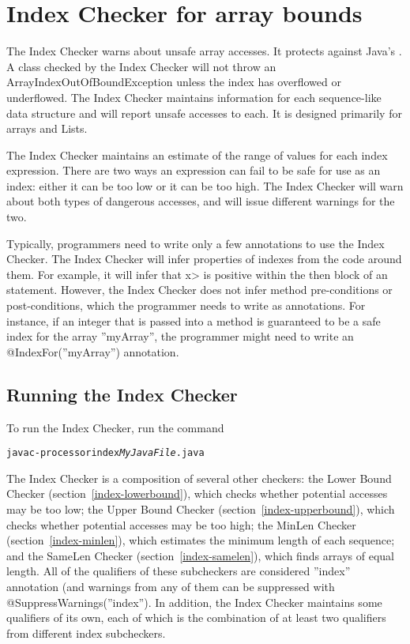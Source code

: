 \chapter{Index Checker for array bounds\label{index-checker}}

The Index Checker warns about unsafe array accesses.  It protects
against Java's
. A
class checked by the
Index Checker  will not throw an ArrayIndexOutOfBoundException unless the
index has overflowed or underflowed. The Index Checker maintains information
for each sequence-like data structure and will report unsafe accesses to each.
It is designed primarily for arrays and Lists.

The Index Checker maintains an estimate of the range of values for each
index expression.  There are two ways an expression can fail to be safe for use as an
index: either it can be too low or it can be too high. The Index
Checker will warn about both types of dangerous accesses, and will
issue different warnings for the two.

Typically, programmers need to write only a few annotations to use the
Index Checker. The Index Checker will infer properties of indexes from
the code around them. For example, it will infer that \<x> is positive
within the then block of an  statement. However, the
Index Checker does not infer method pre-conditions or post-conditions,
which the programmer needs to write as annotations. For instance,
if an integer that is passed into a method is guaranteed to be a safe
index for the array ''myArray'', the programmer might need to
write an @IndexFor(''myArray'') annotation.


\section{Running the Index Checker\label{index-running}}

To run the Index Checker, run the command

\begin{alltt}
  javac -processor index \emph{MyJavaFile}.java
\end{alltt}

The Index Checker is a composition of several other checkers: the Lower
Bound Checker (section~\ref{index-lowerbound}), which checks whether potential accesses may be too low;
the Upper Bound Checker (section~\ref{index-upperbound}), which checks whether potential accesses
may be too high; the MinLen Checker (section~\ref{index-minlen}), which estimates the minimum
length of each sequence; and the SameLen Checker (section~\ref{index-samelen}), which finds arrays of equal length. All of the qualifiers of these subcheckers are considered ''index'' annotation (and warnings from any of them can be suppressed with @SuppressWarnings(''index''). In addition, the Index Checker maintains some qualifiers of its own, each of which is the combination of at least two qualifiers from different index subcheckers.

